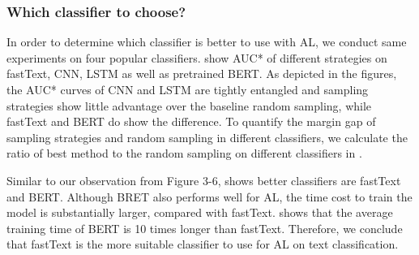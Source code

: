 \subsubsection{Which classifier to choose?}
In order to determine which classifier is better to use with AL, we conduct same experiments on four popular classifiers.  show AUC* of different strategies on fastText, CNN, LSTM as well as pretrained BERT. As depicted in the figures, 
the AUC* curves of CNN and LSTM are tightly entangled and 
sampling strategies show little advantage over the baseline random sampling, 
while fastText and BERT do show the difference. To quantify the margin gap 
of sampling strategies and random sampling in different classifiers, 
we calculate the ratio of best method to the random sampling on 
different classifiers in .

Similar to our observation from Figure 3-6,  
shows better classifiers are fastText and BERT. Although BRET also 
performs well for AL, the time cost to train the model is substantially
larger, compared with fastText.  shows that 
the average training time of BERT is 10 times longer than fastText. 
Therefore, we conclude that fastText is the more suitable classifier to use 
for AL on text classification.

